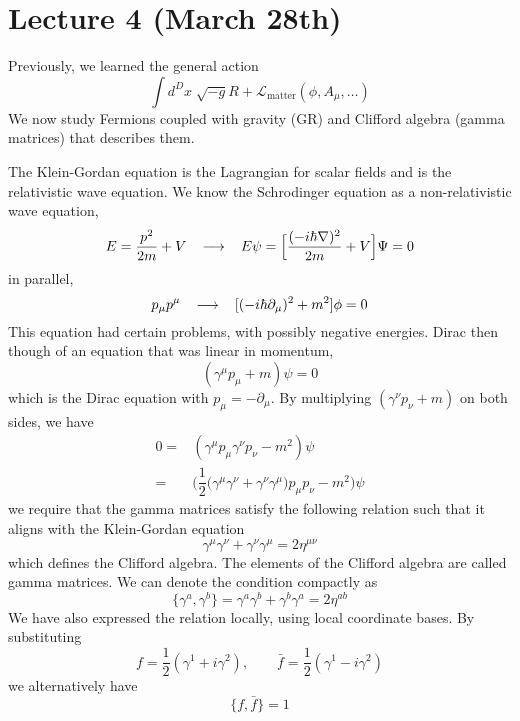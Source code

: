 \section{Lecture 4 (March 28th)}
\begin{recall}
Previously, we learned the general action
\[\int d^{D}x\;\sqrt{-g}R+\mathcal{L}_{\mathrm{matter}}(\phi ,A_{\mu },\ldots )\]
We now study Fermions coupled with gravity (GR) and Clifford algebra (gamma matrices) that describes them.
\end{recall}
\vspace{2ex}
\begin{defi}
The Klein-Gordan equation is the Lagrangian for scalar fields and is the relativistic wave equation. We know the Schrodinger equation as a non-relativistic wave equation, 
\[E=\dfrac{p^2}{2m}+V\hspace{2ex}\longrightarrow  \hspace{2ex}E\psi =\Big[\dfrac{(-i\hbar \nabla )^2}{2m}+V\Big]\mathrm{\Psi} =0\]
in parallel,
\[p_{\mu }p^{\mu }\hspace{2ex}\longrightarrow  \hspace{2ex}[(-i\hbar \partial _{\mu })^2+m^2]\phi =0\]
This equation had certain problems, with possibly negative energies. Dirac then though of an equation that was linear in momentum, 
\[(\gamma ^{\mu }p_{\mu }+m)\psi =0\]
which is the Dirac equation with $p_{\mu }=-\partial _{\mu }$. By multiplying $(\gamma ^{\nu  }p_{\nu  }+m)$ on both sides, we have
\begin{align*}
	0=&(\gamma ^{\mu}p_{\mu }\gamma ^{\nu }p_{\nu }-m^2)\psi \\
	=&\Big(\dfrac{1}{2}\Big(\gamma ^{\mu }\gamma ^{\nu }+\gamma ^{\nu }\gamma ^{\mu }\Big)p_{\mu }p_{\nu }-m^2\Big)\psi 
\end{align*}
we require that the gamma matrices satisfy the following relation such that it aligns with the Klein-Gordan equation
\[\gamma ^{\mu }\gamma ^{\nu }+\gamma ^{\nu }\gamma ^{\mu }=2\eta ^{\mu \nu }\]
which defines the Clifford algebra. The elements of the Clifford algebra are called gamma matrices. We can denote the condition compactly as
\[\{\gamma ^{a},\gamma ^{b}\}=\gamma ^{a}\gamma ^{b}+\gamma ^{b}\gamma ^{a}=2\eta ^{ab}\]
We have also expressed the relation locally, using local coordinate bases. By substituting
\[
f = \frac{1}{2}(\gamma^1 + i\gamma^2), \qquad
\bar{f} = \frac{1}{2}(\gamma^1 - i\gamma^2)
\]
we alternatively have
\[\{f,\bar{f}\}=1\]
\end{defi}
\vspace{2ex}
